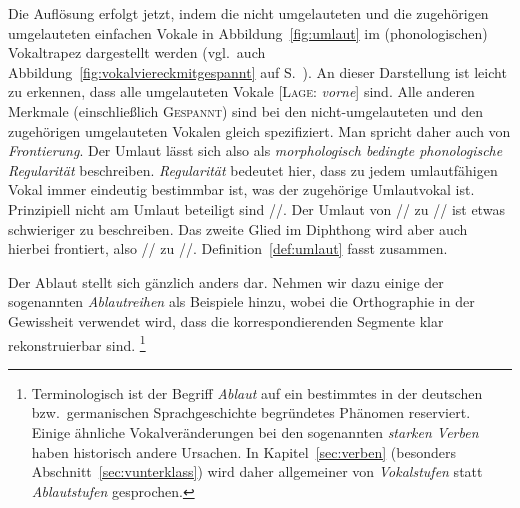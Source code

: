 Die Auflösung erfolgt jetzt, indem die nicht umgelauteten und die zugehörigen umgelauteten einfachen Vokale in Abbildung~\ref{fig:umlaut} im (phonologischen) Vokaltrapez dargestellt werden (vgl.\ auch Abbildung~\ref{fig:vokalviereckmitgespannt} auf S.~\pageref{fig:vokalviereckmitgespannt}).
An dieser Darstellung ist leicht zu erkennen, dass alle umgelauteten Vokale [\textsc{Lage}: \textit{vorne}] sind.
Alle anderen Merkmale (einschließlich \textsc{Gespannt}) sind bei den nicht-umge\-laute\-ten und den zugehörigen umgelauteten Vokalen gleich spezifiziert.
Man spricht daher auch von \textit{Frontierung}.
Der Umlaut lässt sich also als \textit{morphologisch bedingte phonologische Regularität} beschreiben.
\textit{Regularität} bedeutet hier, dass zu jedem umlautfähigen Vokal immer eindeutig bestimmbar ist, was der zugehörige Umlautvokal ist.
Prinzipiell nicht am Umlaut beteiligt sind //.  
Der Umlaut von // zu // ist etwas schwieriger zu beschreiben.
Das zweite Glied im Diphthong wird aber auch hierbei frontiert, also // zu /\textipa{\oe}/.
Definition~\ref{def:umlaut} fasst zusammen.


Der Ablaut stellt sich gänzlich anders dar.
Nehmen wir dazu einige der sogenannten \textit{Ablautreihen} als Beispiele hinzu, wobei die Orthographie in der Gewissheit verwendet wird, dass die korrespondierenden Segmente klar rekonstruierbar sind.%
\footnote{Terminologisch ist der Begriff \textit{Ablaut} auf ein bestimmtes in der deutschen bzw.\ germanischen Sprachgeschichte begründetes Phänomen reserviert.
Einige ähnliche Vokalveränderungen bei den sogenannten \textit{starken Verben} haben historisch andere Ursachen.
In Kapitel~\ref{sec:verben} (besonders Abschnitt~\ref{sec:vunterklass}) wird daher allgemeiner von \textit{Vokalstufen} statt \textit{Ablautstufen} gesprochen.}

\begin{exe}
  \ex\label{ex:morph8827}
  \begin{xlist}
  \end{xlist}
\end{exe}

